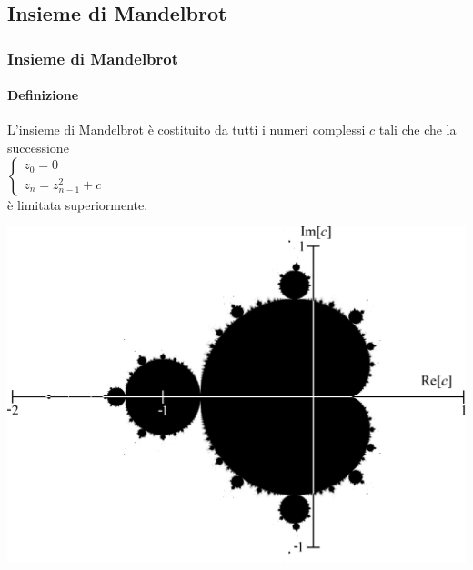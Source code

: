 \documentclass{beamer}
\begin{document}
		\subsection{Insieme di Mandelbrot}
			\begin{frame}
				\frametitle{Insieme di Mandelbrot}
				\framesubtitle{Definizione}
				L'insieme di Mandelbrot è costituito da tutti i numeri complessi $c$ tali che che la successione\\\bigskip
				$
				\begin{cases}
				z_0 = 0 \\
				z_n = z_{n-1}^2 + c 
				\end{cases}
				$
				\\\bigskip
				è limitata superiormente.
				\begin{center}
					\includegraphics[width=0.5\linewidth]{"../Insieme di Mandelbrot/Mandelset_hires"}
				\end{center}
			\end{frame}
\end{document}
